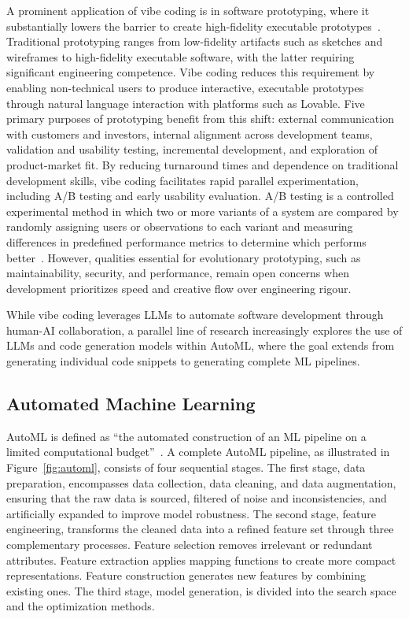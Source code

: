 \documentclass[
english,                 %
bibtex,                  %
includeExtraAbstracts, %
]{kththesis}
\numberwithin{listing}{chapter}
\begin{document}
A prominent application of vibe coding is in software prototyping, where it substantially lowers the barrier to create high-fidelity executable prototypes~\cite{borg_vibe_2025}. Traditional prototyping ranges from low-fidelity artifacts such as sketches and wireframes to high-fidelity executable software, with the latter requiring significant engineering competence. Vibe coding reduces this requirement by enabling non-technical users to produce interactive, executable prototypes through natural language interaction with platforms such as Lovable. Five primary purposes of prototyping benefit from this shift: external communication with customers and investors, internal alignment across development teams, validation and usability testing, incremental development, and exploration of product-market fit. By reducing turnaround times and dependence on traditional development skills, vibe coding facilitates rapid parallel experimentation, including A/B testing and early usability evaluation. A/B testing is a controlled experimental method in which two or more variants of a system are compared by randomly assigning users or observations to each variant and measuring differences in predefined performance metrics to determine which performs better~\cite{shahriari_taking_2016}. However, qualities essential for evolutionary prototyping, such as maintainability, security, and performance, remain open concerns when development prioritizes speed and creative flow over engineering rigour.

While vibe coding leverages \glspl{LLM} to automate software development through human-\gls{AI} collaboration, a parallel line of research increasingly explores the use of \glspl{LLM} and code generation models within \gls{AutoML}, where the goal extends from generating individual code snippets to generating complete \gls{ML} pipelines.

\subsection{Automated Machine Learning}

\gls{AutoML} is defined as ``the automated construction of an \gls{ML} pipeline on a limited computational budget''~\cite{he_automl_2021}. A complete \gls{AutoML} pipeline, as illustrated in Figure~\ref{fig:automl}, consists of four sequential stages. The first stage, data preparation, encompasses data collection, data cleaning, and data augmentation, ensuring that the raw data is sourced, filtered of noise and inconsistencies, and artificially expanded to improve model robustness. The second stage, feature engineering, transforms the cleaned data into a refined feature set through three complementary processes. Feature selection removes irrelevant or redundant attributes. Feature extraction applies mapping functions to create more compact representations. Feature construction generates new features by combining existing ones. The third stage, model generation, is divided into the search space and the optimization methods. 
\end{document}
